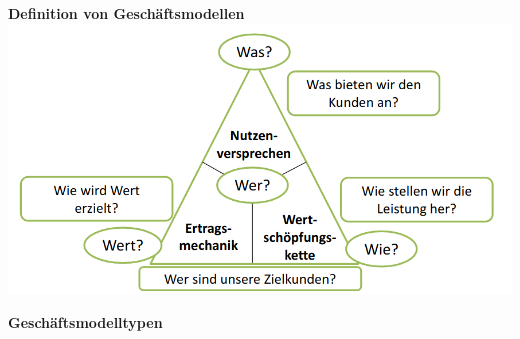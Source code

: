 \documentclass[a4]{scrartcl}
\begin{document}
\newpage


\textbf{Definition von Geschäftsmodellen} \\
\includegraphics[scale=0.45]{wfragen.png}

\vspace*{2em}

\textbf{Geschäftsmodelltypen}
\end{document}
